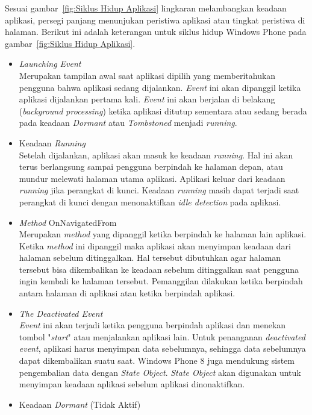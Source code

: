 Sesuai gambar~\ref{fig:Siklus Hidup Aplikasi} lingkaran melambangkan keadaan aplikasi, persegi panjang menunjukan peristiwa aplikasi atau tingkat peristiwa di halaman. Berikut ini adalah keterangan untuk siklus hidup Windows Phone pada gambar~\ref{fig:Siklus Hidup Aplikasi}. 
\begin{itemize}
	\item \textit{Launching Event} \\
	Merupakan tampilan awal saat aplikasi dipilih yang memberitahukan pengguna bahwa aplikasi sedang dijalankan. \textit{Event} ini akan dipanggil ketika aplikasi dijalankan pertama kali. \textit{Event} ini akan berjalan di belakang (\textit{background processing}) ketika aplikasi ditutup sementara atau sedang berada pada keadaan \textit{Dormant} atau \textit{Tombstoned} menjadi \textit{running}.
	\item Keadaan \textit{Running} \\
	Setelah dijalankan, aplikasi akan masuk ke keadaan \textit{running}. Hal ini akan terus berlangsung sampai pengguna berpindah ke halaman depan, atau mundur melewati halaman utama aplikasi. Aplikasi keluar dari keadaan \textit{running} jika perangkat di kunci. Keadaan \textit{running} masih dapat terjadi saat perangkat di kunci dengan menonaktifkan \textit{idle detection} pada aplikasi.
	\item \textit{Method} OnNavigatedFrom \\
	Merupakan \textit{method} yang dipanggil ketika berpindah ke halaman lain aplikasi. Ketika \textit{method} ini dipanggil maka aplikasi akan menyimpan keadaan dari halaman sebelum ditinggalkan. Hal tersebut dibutuhkan agar halaman tersebut bisa dikembalikan ke keadaan sebelum ditinggalkan saat pengguna ingin kembali ke halaman tersebut. Pemanggilan dilakukan ketika berpindah antara halaman di aplikasi atau ketika berpindah aplikasi.
	\item \textit{The Deactivated Event} \\
	\textit{Event} ini akan terjadi ketika pengguna berpindah aplikasi dan menekan tombol "\textit{start}" atau menjalankan aplikasi lain. Untuk penanganan \textit{deactivated event}, aplikasi harus menyimpan data sebelumnya, sehingga data sebelumnya dapat dikembalikan suatu saat. Windows Phone 8 juga mendukung sistem pengembalian data dengan \textit{State Object}. \textit{State Object} akan digunakan untuk menyimpan keadaan aplikasi sebelum aplikasi dinonaktifkan. 
	\item Keadaan \textit{Dormant} (Tidak Aktif) \\

\end{itemize}
